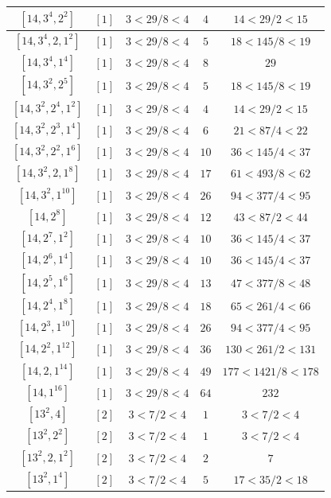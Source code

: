 \documentclass{article}%
\begin{document}
\begin{center}
\begin{longtable}{||c|c|c|c|c||}
$[14, 3^{4}, 2^{2}]$ & $[1]$ & $3 < 29/8 < 4$ & $4$ & $14 < 29/2 < 15$ \\ \hline 
$[14, 3^{4}, 2, 1^{2}]$ & $[1]$ & $3 < 29/8 < 4$ & $5$ & $18 < 145/8 < 19$ \\ \hline 
$[14, 3^{4}, 1^{4}]$ & $[1]$ & $3 < 29/8 < 4$ & $8$ & $29$ \\ \hline 
$[14, 3^{2}, 2^{5}]$ & $[1]$ & $3 < 29/8 < 4$ & $5$ & $18 < 145/8 < 19$ \\ \hline 
$[14, 3^{2}, 2^{4}, 1^{2}]$ & $[1]$ & $3 < 29/8 < 4$ & $4$ & $14 < 29/2 < 15$ \\ \hline 
$[14, 3^{2}, 2^{3}, 1^{4}]$ & $[1]$ & $3 < 29/8 < 4$ & $6$ & $21 < 87/4 < 22$ \\ \hline 
$[14, 3^{2}, 2^{2}, 1^{6}]$ & $[1]$ & $3 < 29/8 < 4$ & $10$ & $36 < 145/4 < 37$ \\ \hline 
$[14, 3^{2}, 2, 1^{8}]$ & $[1]$ & $3 < 29/8 < 4$ & $17$ & $61 < 493/8 < 62$ \\ \hline 
$[14, 3^{2}, 1^{10}]$ & $[1]$ & $3 < 29/8 < 4$ & $26$ & $94 < 377/4 < 95$ \\ \hline 
$[14, 2^{8}]$ & $[1]$ & $3 < 29/8 < 4$ & $12$ & $43 < 87/2 < 44$ \\ \hline 
$[14, 2^{7}, 1^{2}]$ & $[1]$ & $3 < 29/8 < 4$ & $10$ & $36 < 145/4 < 37$ \\ \hline 
$[14, 2^{6}, 1^{4}]$ & $[1]$ & $3 < 29/8 < 4$ & $10$ & $36 < 145/4 < 37$ \\ \hline 
$[14, 2^{5}, 1^{6}]$ & $[1]$ & $3 < 29/8 < 4$ & $13$ & $47 < 377/8 < 48$ \\ \hline 
$[14, 2^{4}, 1^{8}]$ & $[1]$ & $3 < 29/8 < 4$ & $18$ & $65 < 261/4 < 66$ \\ \hline 
$[14, 2^{3}, 1^{10}]$ & $[1]$ & $3 < 29/8 < 4$ & $26$ & $94 < 377/4 < 95$ \\ \hline 
$[14, 2^{2}, 1^{12}]$ & $[1]$ & $3 < 29/8 < 4$ & $36$ & $130 < 261/2 < 131$ \\ \hline 
$[14, 2, 1^{14}]$ & $[1]$ & $3 < 29/8 < 4$ & $49$ & $177 < 1421/8 < 178$ \\ \hline 
$[14, 1^{16}]$ & $[1]$ & $3 < 29/8 < 4$ & $64$ & $232$ \\ \hline 
$[13^{2}, 4]$ & $[2]$ & $3 < 7/2 < 4$ & $1$ & $3 < 7/2 < 4$ \\ \hline 
$[13^{2}, 2^{2}]$ & $[2]$ & $3 < 7/2 < 4$ & $1$ & $3 < 7/2 < 4$ \\ \hline 
$[13^{2}, 2, 1^{2}]$ & $[2]$ & $3 < 7/2 < 4$ & $2$ & $7$ \\ \hline 
$[13^{2}, 1^{4}]$ & $[2]$ & $3 < 7/2 < 4$ & $5$ & $17 < 35/2 < 18$ \\ \hline 

\end{longtable}
\end{center}
\end{document}
